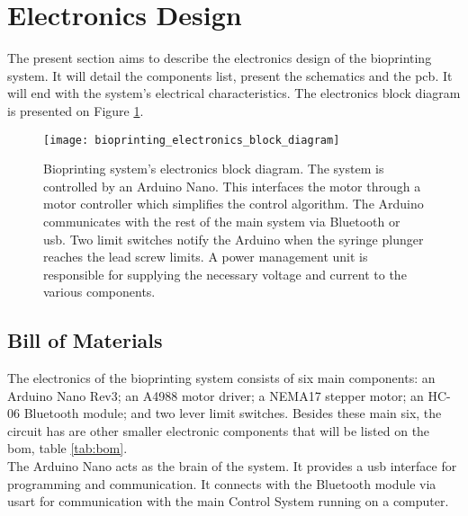 


\section{Electronics Design}
\label{sec:bioprinting_system_electronics_design}

The present section aims to describe the electronics design of the bioprinting system. It will detail the components list, present the schematics and the \gls{pcb}. It will end with the system's electrical characteristics. The electronics block diagram is presented on Figure \ref{fig:bioprinting_electronics_block_diagram}.

\begin{figure}[htbp]
	\centering
	\texttt{[image: bioprinting\_electronics\_block\_diagram]}
	\caption{Bioprinting system's electronics block diagram. The system is controlled by an Arduino Nano. This interfaces the motor through a motor controller which simplifies the control algorithm. The Arduino communicates with the rest of the main system via Bluetooth or \gls{usb}. Two limit switches notify the Arduino when the syringe plunger reaches the lead screw limits. A power management unit is responsible for supplying the necessary voltage and current to the various components.}
	\label{fig:bioprinting_electronics_block_diagram}
\end{figure}

\subsection{Bill of Materials}
\label{subsec:bioprinting_system_electronics_design_bom}

The electronics of the bioprinting system consists of six main components: an Arduino Nano Rev3; an A4988 motor driver; a NEMA17 stepper motor; an HC-06 Bluetooth module; and two lever limit switches. Besides these main six, the circuit has are other smaller electronic components that will be listed on the \gls{bom}, table \ref{tab:bom}.\\

The Arduino Nano acts as the brain of the system. It provides a \gls{usb} interface for programming and communication. It connects with the Bluetooth module via \gls{usart} for communication with the main Control System running on a computer.

